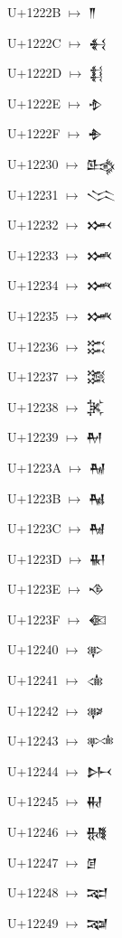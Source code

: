 {\noindent U+1222B  $\mapsto$ {\cufont 𒈫}\par
\noindent U+1222C  $\mapsto$ {\cufont 𒈬}\par
\noindent U+1222D  $\mapsto$ {\cufont 𒈭}\par
\noindent U+1222E  $\mapsto$ {\cufont 𒈮}\par
\noindent U+1222F  $\mapsto$ {\cufont 𒈯}\par
\noindent U+12230  $\mapsto$ {\cufont 𒈰}\par
\noindent U+12231  $\mapsto$ {\cufont 𒈱}\par
\noindent U+12232  $\mapsto$ {\cufont 𒈲}\par
\noindent U+12233  $\mapsto$ {\cufont 𒈳}\par
\noindent U+12234  $\mapsto$ {\cufont 𒈴}\par
\noindent U+12235  $\mapsto$ {\cufont 𒈵}\par
\noindent U+12236  $\mapsto$ {\cufont 𒈶}\par
\noindent U+12237  $\mapsto$ {\cufont 𒈷}\par
\noindent U+12238  $\mapsto$ {\cufont 𒈸}\par
\noindent U+12239  $\mapsto$ {\cufont 𒈹}\par
\noindent U+1223A  $\mapsto$ {\cufont 𒈺}\par
\noindent U+1223B  $\mapsto$ {\cufont 𒈻}\par
\noindent U+1223C  $\mapsto$ {\cufont 𒈼}\par
\noindent U+1223D  $\mapsto$ {\cufont 𒈽}\par
\noindent U+1223E  $\mapsto$ {\cufont 𒈾}\par
\noindent U+1223F  $\mapsto$ {\cufont 𒈿}\par
\noindent U+12240  $\mapsto$ {\cufont 𒉀}\par
\noindent U+12241  $\mapsto$ {\cufont 𒉁}\par
\noindent U+12242  $\mapsto$ {\cufont 𒉂}\par
\noindent U+12243  $\mapsto$ {\cufont 𒉃}\par
\noindent U+12244  $\mapsto$ {\cufont 𒉄}\par
\noindent U+12245  $\mapsto$ {\cufont 𒉅}\par
\noindent U+12246  $\mapsto$ {\cufont 𒉆}\par
\noindent U+12247  $\mapsto$ {\cufont 𒉇}\par
\noindent U+12248  $\mapsto$ {\cufont 𒉈}\par
\noindent U+12249  $\mapsto$ {\cufont 𒉉}\par
}
